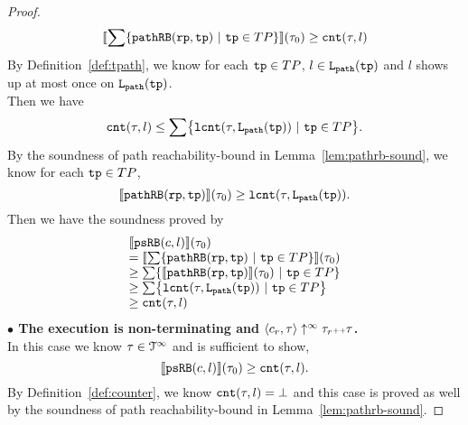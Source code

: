 \begin{proof}
    \[
        \econfig{\sum \left\{ \inoutB(\rprog, \tpath) ~\vert~ \tpath \in TP \right\}}(\trace_0)  
        \geq   \counter(\trace, l)
    \]
    By Definition~\ref{def:tpath}, we know for each $\mathtt{tp} \in TP$, $l \in \mathtt{L}_{\mathtt{path}}(\mathtt{tp})$ and $l$ shows up at most once on $\mathtt{L}_{\mathtt{path}}(\mathtt{tp})$. 
    \\
    Then we have
    \[
    \counter(\trace, l) \leq \sum\left\{ \lcounter(\trace, \pathl(\tpath)) ~\vert~ \tpath \in TP \right\}.
    \]
    By the soundness of path reachability-bound in Lemma~\ref{lem:pathrb-sound}, we know for each $\mathtt{tp} \in TP$,
    \[
        \llbracket \mathtt{pathRB}(\mathtt{rp}, \mathtt{tp}) \rrbracket(\mathtt{\tau}_0)  \geq  \mathtt{lcnt}(\mathtt{\tau}, \mathtt{L}_{\mathtt{path}}(\mathtt{tp})).
    \]
    Then we have the soundness proved by
    \[
        \begin{array}{l}
        \econfig{\psRB(c, l)}(\trace_0) 
        \\ =
        \econfig{\sum \left\{ \inoutB(\rprog, \tpath) ~\vert~ \tpath \in TP \right\}}(\trace_0) 
        \\ \geq 
        \sum\left\{ \econfig{\inoutB(\rprog, \tpath)}(\trace_0) ~\vert~ \tpath \in TP \right\}
        \\ \geq 
        \sum\left\{ \lcounter(\trace, \pathl(\tpath)) ~\vert~ \tpath \in TP \right\}
        \\ \geq \counter(\trace, l)
        \end{array}
    \]
    \textbf{$\bullet$ The execution is non-terminating and {$\langle {c_r}, \mathtt{\tau} \rangle \uparrow^{\infty} \mathtt{\tau}_r {\scriptscriptstyle ++} \mathtt{\tau}$}.} 
    \\
     In this case we know $\mathtt{\tau} \in \mathcal{T}^{\infty}$ and is sufficient to show,
    \[
      \llbracket \mathtt{psRB}(c, l) \rrbracket(\mathtt{\tau}_0) \geq \mathtt{cnt}(\mathtt{\tau}, l).
    \]
    By Definition~\ref{def:counter}, we know $\mathtt{cnt}(\mathtt{\tau}, l) = \bot$ and this case is proved as well by the soundness of path reachability-bound in Lemma~\ref{lem:pathrb-sound}.
    \end{proof}
  
